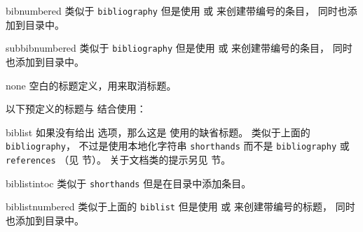 \begin{valuelist*}
\item[bibnumbered]
类似于 \texttt{bibliography} 但是使用  或  来创建带编号的条目，
同时也添加到目录中。

\item[subbibnumbered]
类似于 \texttt{bibliography} 但是使用  或  来创建带编号的条目，
同时也添加到目录中。

\item[none]
空白的标题定义，用来取消标题。

\end{valuelist*}

以下预定义的标题与  结合使用：

\begin{valuelist*}

\item[biblist]
如果没有给出  选项，那么这是  使用的缺省标题。
类似于上面的 \texttt{bibliography}，
不过是使用本地化字符串 \texttt{shorthands} 而不是 \texttt{bibliography} 或 \texttt{references}
（见  节）。
关于文档类的提示另见  节。

\item[biblistintoc]
类似于 \texttt{shorthands} 但是在目录中添加条目。

\item[biblistnumbered]
类似于上面的 \texttt{biblist} 但是使用  或  来创建带编号的标题，
同时也添加到目录中。

\end{valuelist*}

